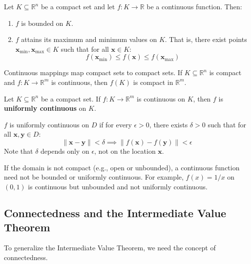 \begin{theorem}
Let $K \subseteq \mathbb{R}^n$ be a compact set and let $f: K \to \mathbb{R}$ be a continuous function. Then:
\begin{enumerate}
    \item $f$ is bounded on $K$.
    \item $f$ attains its maximum and minimum values on $K$. That is, there exist points $\mathbf{x}_{\min}, \mathbf{x}_{\max} \in K$ such that for all $\mathbf{x} \in K$:
    \[ f(\mathbf{x}_{\min}) \le f(\mathbf{x}) \le f(\mathbf{x}_{\max}) \]
\end{enumerate}
\end{theorem}

\begin{theorem}
Continuous mappings map compact sets to compact sets. If $K \subseteq \mathbb{R}^n$ is compact and $f: K \to \mathbb{R}^m$ is continuous, then $f(K)$ is compact in $\mathbb{R}^m$.
\end{theorem}

\begin{theorem}
Let $K \subseteq \mathbb{R}^n$ be a compact set. If $f: K \to \mathbb{R}^m$ is continuous on $K$, then $f$ is \textbf{uniformly continuous} on $K$.
\end{theorem}

\begin{definition}
$f$ is uniformly continuous on $D$ if for every $\epsilon > 0$, there exists $\delta > 0$ such that for all $\mathbf{x}, \mathbf{y} \in D$:
\[ \|\mathbf{x} - \mathbf{y}\| < \delta \implies \|f(\mathbf{x}) - f(\mathbf{y})\| < \epsilon \]
Note that $\delta$ depends only on $\epsilon$, not on the location $\mathbf{x}$.
\end{definition}

\begin{remark}
If the domain is not compact (e.g., open or unbounded), a continuous function need not be bounded or uniformly continuous.
For example, $f(x) = 1/x$ on $(0, 1)$ is continuous but unbounded and not uniformly continuous.
\end{remark}

\subsection{Connectedness and the Intermediate Value Theorem}

To generalize the Intermediate Value Theorem, we need the concept of connectedness.

